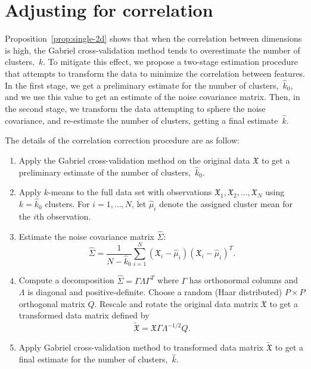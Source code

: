 \documentclass[12pt]{article}
\newcommand{\T}{T}
\newcommand{\dataX}{\mathfrak{X}}
\begin{document}
\section{Adjusting for correlation}
\label{sec:corr-correct}


Proposition~\ref{prop:single-2d} shows that when the correlation between
dimensions is high, the Gabriel cross-validation method tends to overestimate
the number of clusters,~$k$. To mitigate this effect, we propose a two-stage
estimation procedure that attempts to transform the data to minimize the
correlation between features. In the first stage, we get a preliminary
estimate for the number of clusters,~$\hat k_0$, and we use this value to get
an estimate of the noise covariance matrix. Then, in the second stage, we
transform the data attempting to sphere the noise covariance, and re-estimate
the number of clusters, getting a final estimate~$\hat k$.

The details of the correlation correction procedure are as follow:

\begin{enumerate}

  \item Apply the Gabriel cross-validation method on the original data
    $\dataX$ to get a preliminary estimate of the number of
    clusters,~$\hat k_0$.

  \item Apply $k$-means to the full data set with observations
    $\dataX_1, \dataX_2, \dotsc, \dataX_N$ using $k = \hat k_0$ clusters.
    For $i = 1, \dotsc, N$, let $\hat \mu_i$ denote the assigned cluster
    mean for the $i$th observation.

	\item Estimate the noise covariance matrix $\hat{\Sigma}$:
    \[
      \hat{\Sigma}
        =
        \frac{1}{N - \hat k_0}
        \sum^N_{i=1}
        (\dataX_i-\hat{\mu}_i)(\dataX_i-\hat{\mu}_i)^\T.
    \]

  \item \label{step:transform}
    Compute a decomposition $\hat{\Sigma} = \Gamma\Lambda\Gamma^\T$
    where $\Gamma$ has orthonormal columns and
    $\Lambda$ is diagonal and positive-definite.
    Choose a random (Haar distributed) $P \times P$ orthogonal matrix $Q$.
    Rescale and rotate the original data matrix $\dataX$ to get a
    transformed data matrix defined by
    \[
      \tilde{\dataX} = \dataX\Gamma\Lambda^{-1/2}Q.
    \]

  \item Apply Gabriel cross-validation method to transformed data matrix
    $\tilde{\dataX}$ to get a final estimate for the number of
    clusters,~$\hat k$. 

\end{enumerate}
\end{document}
